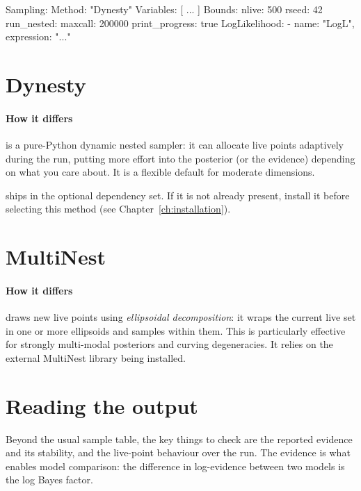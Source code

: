 \begin{yamlwin}
Sampling:
  Method: "Dynesty"
  Variables: [ ... ]
  Bounds:
    nlive: 500
    rseed: 42
    run_nested:
      maxcall: 200000
      print_progress: true
  LogLikelihood:
    - {name: "LogL", expression: "..."}
\end{yamlwin}

\section{Dynesty}
\label{sec:s-dynesty}

\paragraph{How it differs} \cite{Speagle:2019ivv} is a pure-Python dynamic
nested sampler: it can allocate live points adaptively during the run, putting more effort into the
posterior (or the evidence) depending on what you care about. It is a flexible default for
moderate dimensions.

\begin{jnote}
 ships in the optional  dependency set. If it is not already present,
install it before selecting this method (see Chapter~\ref{ch:installation}).
\end{jnote}

\section{MultiNest}
\label{sec:s-multinest}

\paragraph{How it differs} \cite{Feroz:2008xx} draws new live points using
\emph{ellipsoidal decomposition}: it wraps the current live set in one or more ellipsoids and
samples within them. This is particularly effective for strongly multi-modal posteriors and
curving degeneracies. It relies on the external MultiNest library being installed.

\section{Reading the output}
\label{sec:nested-output}

Beyond the usual sample table, the key things to check are the reported evidence and its stability,
and the live-point behaviour over the run. The evidence is what enables model comparison: the
difference in log-evidence between two models is the log Bayes factor.
